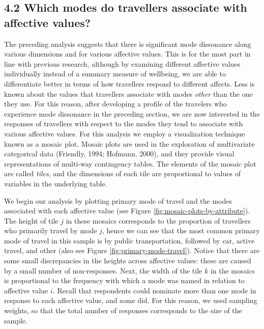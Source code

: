 \documentclass[]{elsarticle} %
\begin{document}
\hypertarget{which-modes-do-travellers-associate-with-affective-values}{%
\subsection{4.2 Which modes do travellers associate with affective
values?}\label{which-modes-do-travellers-associate-with-affective-values}}

The preceding analysis suggests that there is significant mode
dissonance along various dimensions and for various affective values.
This is for the most part in line with previous research, although by
examining different affective values individually instead of a summary
measure of wellbeing, we are able to differentiate better in terms of
how travellers respond to different affects. Less is known about the
values that travellers associate with modes \emph{other} than the one
they use. For this reason, after developing a profile of the travelers
who experience mode dissonance in the preceding section, we are now
interested in the responses of travellers with respect to the modes they
tend to associate with various affective values. For this analysis we
employ a visualization technique known as a mosaic plot. Mosaic plots
are used in the exploration of multivariate categorical data (Friendly,
1994; Hofmann, 2000), and they provide visual representations of
multi-way contingency tables. The elements of the mosaic plot are called
\emph{tiles}, and the dimensions of each tile are proportional to values
of variables in the underlying table.

We begin our analysis by plotting primary mode of travel and the modes
associated with each affective value (see Figure
\ref{fig:mosaic-plots-by-attribute}). The height of tile \(j\) in these
mosaics corresponds to the proportion of travellers who primarily travel
by mode \(j\), hence we can see that the most common primary mode of
travel in this sample is by public transportation, followed by car,
active travel, and other (also see Figure
\ref{fig:primary-mode-travel}). Notice that there are some small
discrepancies in the heights across affective values: these are caused
by a small number of non-responses. Next, the width of the tile \(k\) in
the mosaics is proportional to the frequency with which a mode was named
in relation to affective value \(i\). Recall that respondents could
nominate more than one mode in response to each affective value, and
some did. For this reason, we used sampling weights, so that the total
number of responses corresponds to the size of the sample.
\end{document}

